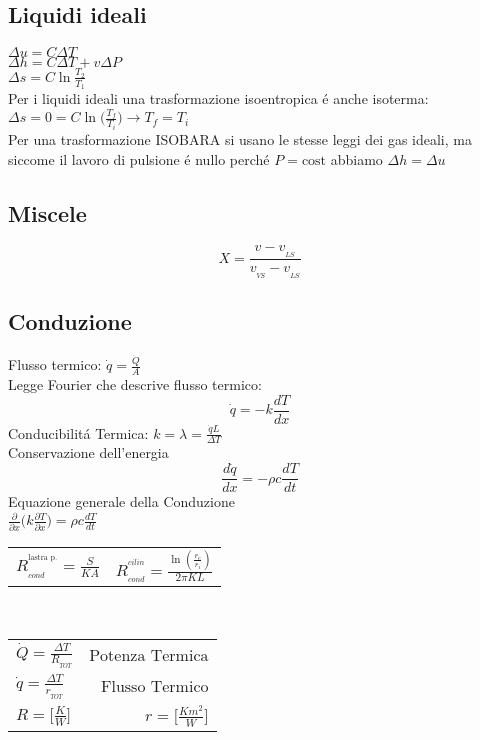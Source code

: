 \documentclass[landscape,a4paper]{article}
\begin{document}
\begin{multicols}{4}
\section*{Liquidi ideali}
$ \Delta u = C\Delta T $ \\
$ \Delta h = C\Delta T + v\Delta P $ \\
$ \Delta s = C\ln\frac{T_2}{T_1} $ \\
Per i liquidi ideali una trasformazione isoentropica é anche isoterma: \\
\(\Delta s = 0 = C\ln\big(\frac{T_f}{T_i}\big) \rightarrow T_f = T_i \) \\
Per una trasformazione ISOBARA si usano le stesse leggi dei gas ideali, ma siccome il lavoro di pulsione é nullo perché \(P=\text{cost}\) abbiamo \(\Delta h = \Delta u\)
\subsection*{Miscele}
\[ X =\frac{v - v_{_{LS}}}{v_{_{VS}} - v_{_{LS}}}\]


\subsection*{Conduzione}
Flusso termico: \(\dot{q} = \frac{\dot{Q}}{A} \) \\
Legge Fourier che descrive flusso termico:
\[
\dot{q} = -k\frac{dT}{dx}
\]
Conducibilitá Termica: \( k = \lambda = \frac{\dot{q}L}{\Delta T}\) \\
Conservazione dell'energia
\[
\frac{d\dot{q}}{dx}=-\rho c\frac{dT}{dt}
\]
Equazione generale della Conduzione \\
\(\frac{\partial}{\partial x}\bigg( k\frac{\partial T}{\partial x} \bigg) = \rho c \frac{dT}{dt}
\) \\
\begin{tabular}{c|c}
$ R_{_{cond}}^{^{\text{lastra p.}}} =\frac{S}{KA}$
& $ R_{_{cond}}^{^{cilin}} = \frac {\ln ( \frac {r_{e}}{r_{i}} )} {2 \pi KL} $ \\
\end{tabular} \\

\begin{tabular}{l r}
$\dot{Q} =\frac{\Delta T}{R_{_{TOT}}} $& $\textrm{Potenza Termica}$ \\
$\dot{q} =\frac{\Delta T}{r_{_{TOT}}}$  &$ \textrm{Flusso Termico} $ \\
$ R = \Big[ \frac {K}{W}\Big ]$ & $ r =\Big [\frac{Km^2}{W} \Big] $ \\
\end{tabular}


\end{multicols}
\end{document}
